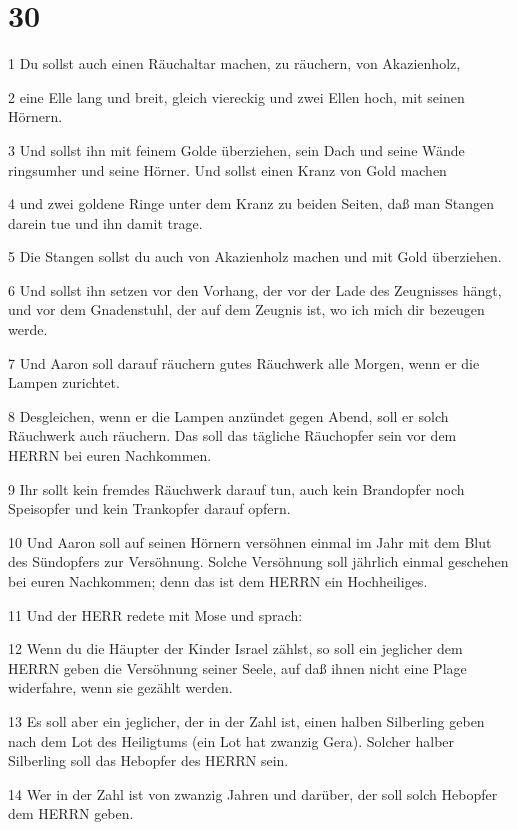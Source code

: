 \chapter{30}

\par 1 Du sollst auch einen Räuchaltar machen, zu räuchern, von Akazienholz,
\par 2 eine Elle lang und breit, gleich viereckig und zwei Ellen hoch, mit seinen Hörnern.
\par 3 Und sollst ihn mit feinem Golde überziehen, sein Dach und seine Wände ringsumher und seine Hörner. Und sollst einen Kranz von Gold machen
\par 4 und zwei goldene Ringe unter dem Kranz zu beiden Seiten, daß man Stangen darein tue und ihn damit trage.
\par 5 Die Stangen sollst du auch von Akazienholz machen und mit Gold überziehen.
\par 6 Und sollst ihn setzen vor den Vorhang, der vor der Lade des Zeugnisses hängt, und vor dem Gnadenstuhl, der auf dem Zeugnis ist, wo ich mich dir bezeugen werde.
\par 7 Und Aaron soll darauf räuchern gutes Räuchwerk alle Morgen, wenn er die Lampen zurichtet.
\par 8 Desgleichen, wenn er die Lampen anzündet gegen Abend, soll er solch Räuchwerk auch räuchern. Das soll das tägliche Räuchopfer sein vor dem HERRN bei euren Nachkommen.
\par 9 Ihr sollt kein fremdes Räuchwerk darauf tun, auch kein Brandopfer noch Speisopfer und kein Trankopfer darauf opfern.
\par 10 Und Aaron soll auf seinen Hörnern versöhnen einmal im Jahr mit dem Blut des Sündopfers zur Versöhnung. Solche Versöhnung soll jährlich einmal geschehen bei euren Nachkommen; denn das ist dem HERRN ein Hochheiliges.
\par 11 Und der HERR redete mit Mose und sprach:
\par 12 Wenn du die Häupter der Kinder Israel zählst, so soll ein jeglicher dem HERRN geben die Versöhnung seiner Seele, auf daß ihnen nicht eine Plage widerfahre, wenn sie gezählt werden.
\par 13 Es soll aber ein jeglicher, der in der Zahl ist, einen halben Silberling geben nach dem Lot des Heiligtums (ein Lot hat zwanzig Gera). Solcher halber Silberling soll das Hebopfer des HERRN sein.
\par 14 Wer in der Zahl ist von zwanzig Jahren und darüber, der soll solch Hebopfer dem HERRN geben.
